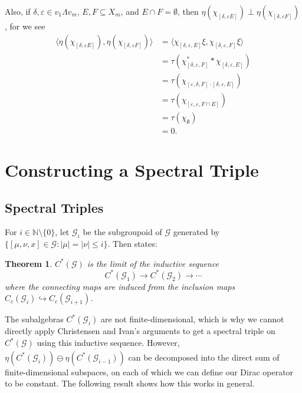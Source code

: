 \documentclass[12pt]{amsart}
\newcommand{\sm}{\setminus}
\newcommand{\sse}{\subseteq}
\newcommand{\mc}[1]{\mathcal{#1}}
\newcommand{\emp}{\emptyset}
\newcommand{\N}{\mathbb{N}}
\newcommand{\de}{\delta}
\newcommand{\ep}{\varepsilon}
\newcommand{\La}{\Lambda}
\theoremstyle{plain} %
\newtheorem{Theorem}{Theorem}[section]
\theoremstyle{definition} %
\begin{document}
Also, if $\de, \ep \in v_1 \La v_m$, $E, F \sse X_m$, and $E\cap F = \emp$, then $\eta(\chi_{[\de, \ep E]}) \perp \eta(\chi_{[\de, \ep F]})$, for we see
\begin{align*}
        \langle \eta(\chi_{[\de, \ep E]}), \eta(\chi_{[\de, \ep F]})\rangle &= \langle \chi_{[\de, \ep, E]} \xi, \chi_{[\de, \ep, F]} \xi\rangle\\
        &= \tau(\chi_{[\de, \ep, F]}^* *\chi_{[\de, \ep, E]})\\
        &= \tau(\chi_{[\ep, \de, F] \cdot [\de, \ep, E]})\\
        &= \tau(\chi_{[\ep, \ep, F\cap E]})\\
        &= \tau (\chi_{\emp})\\
        &=0.
    \end{align*}





\section{Constructing a Spectral Triple}
\subsection{Spectral Triples}
\label{sec spectral triple}
For $i \in \N \sm \{0\}$, let $\mc{G}_i$ be the subgroupoid of $\mc{G}$ generated by $\{ [\mu, \nu, x] \in \mc{G}: |\mu| = |\nu| \leq i\}$. Then \cite[Theorem 5.1]{MS22}  states:
\begin{Theorem}
    $C^*(\mc{G})$ is the limit of the inductive sequence $$C^*(\mc{G}_1) \to C^*(\mc{G}_2) \to \cdots$$ where the connecting maps are induced from the inclusion maps $C_c(\mc{G}_i) \hookrightarrow C_c(\mc{G}_{i+1})$.
\end{Theorem}
The subalgebras $C^*(\mc{G}_i)$ are not finite-dimensional, which is why we cannot directly apply Christensen and Ivan's arguments to get a spectral triple on $C^*(\mc{G})$ using this inductive sequence. However, $\overline{\eta(C^*(\mc{G}_i))} \ominus \overline{\eta(C^*(\mc{G}_{i-1}))}$ can be decomposed into the direct sum of finite-dimensional subspaces, on each of which we can define our Dirac operator to be constant. The following result shows how this works in general.
\end{document}
